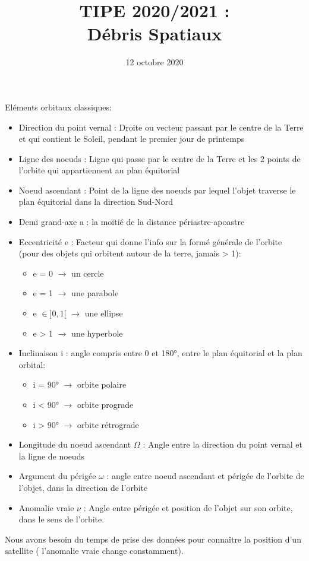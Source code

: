 \documentclass[a4paper,1pt]{article}
\title{TIPE 2020/2021 : \\ Débris Spatiaux}
\date{12 octobre 2020}
\begin{document}
\maketitle

Eléments orbitaux classiques:

\begin{itemize}
    \item Direction du point vernal : Droite ou vecteur passant par le centre de la Terre et qui contient le Soleil, pendant le premier jour de printemps
    \item Ligne des noeuds : Ligne qui passe par le centre de la Terre et les 2 points de l'orbite qui appartiennent au plan équitorial
    \item Noeud ascendant : Point de la ligne des noeuds par lequel l'objet traverse le plan équitorial dans la direction Sud-Nord
    \item Demi grand-axe a : la moitié de la distance périastre-apoastre
    \item Eccentricité e : Facteur qui donne l'info sur la formé générale de l'orbite (pour des objets qui orbitent autour de la terre, jamais > 1):
            \begin{itemize}
                \item e = 0 $\rightarrow$ un cercle
                \item e = 1 $\rightarrow$ une parabole
                \item e $\in ]0,1[$ $\rightarrow$ une ellipse
                \item e > 1 $\rightarrow$ une hyperbole
            \end{itemize}
    \item Inclinaison i : angle  compris entre 0 et 180°, entre le plan équitorial et la plan orbital:
            \begin{itemize}
                \item i = 90° $\rightarrow$ orbite polaire
                \item i < 90° $\rightarrow$ orbite prograde
                \item i > 90° $\rightarrow$ orbite rétrograde
            \end{itemize}
    \item Longitude du noeud ascendant $\Omega$ : Angle entre la direction du point vernal et la ligne de noeuds
    \item Argument du périgée $\omega$ : angle entre noeud ascendant et périgée de l'orbite de l'objet, dans la direction de l'orbite
    \item Anomalie vraie $\nu$ : Angle entre périgée et position de l'objet sur son orbite, dans le sens de l'orbite.
\end{itemize}

Nous avons besoin du temps de prise des données pour connaître la position d'un satellite ( l'anomalie vraie change constamment).
\end{document}
